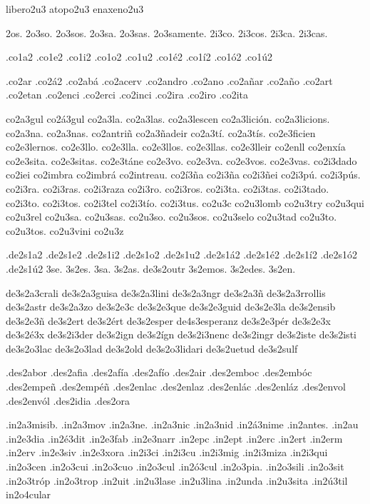{{%
libero2u3 
atopo2u3 
enaxeno2u3 

2os. 2o3so. 2o3sos. 2o3sa. 2o3sas. 2o3samente. 
2i3co. 2i3cos. 2i3ca. 2i3cas. 

.co1a2 .co1e2 .co1i2 .co1o2 .co1u2        .co1^^e92 .co1^^ed2 .co1^^f32 .co1^^fa2 

.co2ar 
.co2^^e12 
.co2ab^^e1 
.co2acerv 
.co2andro 
.co2ano 
.co2a^^f1ar 
.co2a^^f1o 
.co2art 
.co2etan 
.co2enci 
.co2erci 
.co2inci 
.co2ira 
.co2iro 
.co2ita 

co2a3gul 
co2^^e13gul 
co2a3la. 
co2a3las. 
co2a3lescen 
co2a3lici^^f3n. 
co2a3licions. 
co2a3na. 
co2a3nas. 
co2antri^^f1 
co2a3^^f1adeir 
co2a3t^^ed. 
co2a3t^^eds. 
co2e3ficien 
co2e3lernos. 
co2e3llo. 
co2e3lla. 
co2e3llos. 
co2e3llas. 
co2e3lleir 
co2enll 
co2enx^^eda 
co2e3sita. 
co2e3sitas. 
co2e3t^^e1ne 
co2e3vo. 
co2e3va. 
co2e3vos. 
co2e3vas. 
co2i3dado 
co2iei 
co2imbra 
co2imbr^^e1 
co2intreau. 
co2^^ed3^^f1a 
co2i3^^f1a 
co2i3^^f1ei 
co2i3p^^fa. 
co2i3p^^fas. 
co2i3ra. 
co2i3ras. 
co2i3raza 
co2i3ro. 
co2i3ros. 
co2i3ta. 
co2i3tas. 
co2i3tado. 
co2i3to. 
co2i3tos. 
co2i3tel 
co2i3t^^edo. 
co2i3tus. 
co2u3c 
co2u3lomb 
co2u3try 
co2u3qui 
co2u3rel 
co2u3sa. 
co2u3sas. 
co2u3so. 
co2u3sos. 
co2u3selo 
co2u3tad 
co2u3to. 
co2u3tos. 
co2u3vini 
co2u3z 

.de2s1a2 .de2s1e2 .de2s1i2 .de2s1o2 .de2s1u2 .de2s1^^e12 .de2s1^^e92 .de2s1^^ed2 .de2s1^^f32 .de2s1^^fa2 
3se. 3s2es. 3sa. 3s2as. de3s2outr 3s2emos. 3s2edes. 3s2en. 

de3s2a3crali 
de3s2a3guisa 
de3s2a3lini 
de3s2a3ngr 
de3s2a3^^f1 
de3s2a3rrollis 
de3s2astr 
de3s2a3zo 
de3s2e3c 
de3s2e3que 
de3s2e3guid 
de3s2e3la 
de3s2ensib 
de3s2e3^^f1 
de3s2ert 
de3s2^^e9rt 
de3s2esper de4s3esperanz 
de3s2e3p^^e9r 
de3s2e3x 
de3s2^^e93x 
de3s2i3der 
de3s2ign 
de3s2^^edgn 
de3s2i3nenc 
de3s2ingr 
de3s2iste 
de3s2isti 
de3s2o3lac 
de3s2o3lad 
de3s2old 
de3s2o3lidari 
de3s2uetud 
de3s2sulf 

.des2abor 
.des2afia 
.des2af^^eda 
.des2af^^edo 
.des2air 
.des2emboc 
.des2emb^^f3c 
.des2empe^^f1 
.des2emp^^e9^^f1 
.des2enlac 
.des2enlaz 
.des2enl^^e1c 
.des2enl^^e1z 
.des2envol 
.des2env^^f3l 
.des2idia 
.des2ora 


.in2a3misib. 
.in2a3mov 
.in2a3ne. 
.in2a3nic 
.in2a3nid 
.in2^^e13nime 
.in2antes. 
.in2au 
.in2e3dia 
.in2^^e93dit 
.in2e3fab 
.in2e3narr 
.in2epc 
.in2ept 
.in2erc 
.in2ert 
.in2erm 
.in2erv 
.in2e3siv 
.in2e3xora 
.in2i3ci 
.in2i3cu 
.in2i3mig 
.in2i3miza 
.in2i3qui 
.in2o3cen 
.in2o3cui 
.in2o3cuo 
.in2o3cul 
.in2^^f33cul 
.in2o3pia. 
.in2o3sili 
.in2o3sit 
.in2o3tr^^f3p 
.in2o3trop 
.in2uit 
.in2u3lase 
.in2u3lina 
.in2unda 
.in2u3sita 
.in2^^fa3til 
in2o4cular 

}}
